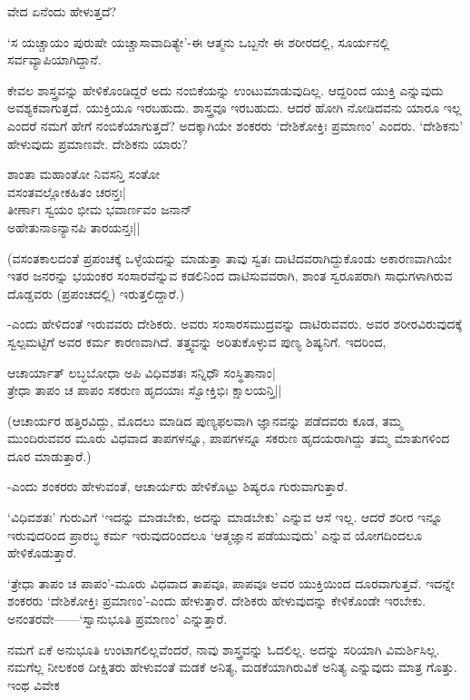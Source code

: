 ವೇದ ಏನೆಂದು ಹೇಳುತ್ತದೆ?

`ಸ ಯಚ್ಚಾಯಂ ಪುರುಷೇ ಯಚ್ಚಾಸಾವಾದಿತ್ಯೇ'-ಈ ಆತ್ಮನು ಒಬ್ಬನೇ ಈ ಶರೀರದಲ್ಲಿ, ಸೂರ್ಯನಲ್ಲಿ ಸರ್ವವ್ಯಾಪಿಯಾಗಿದ್ದಾನೆ.

ಕೇವಲ ಶಾಸ್ತ್ರವನ್ನು ಹೇಳಿಕೊಂಡಿದ್ದರೆ ಅದು ನಂಬಿಕೆಯನ್ನು ಉಂಟುಮಾಡುವುದಿಲ್ಲ. ಆದ್ದರಿಂದ ಯುಕ್ತಿ ಎನ್ನುವುದು ಅವಶ್ಯಕವಾಗುತ್ತದೆ. ಯುಕ್ತಿಯೂ ಇರಬಹುದು. ಶಾಸ್ತ್ರವೂ ಇರಬಹುದು. ಆದರೆ ಹೋಗಿ ನೋಡಿದವನು ಯಾರೂ ಇಲ್ಲ ಎಂದರೆ ನಮಗೆ ಹೇಗೆ ನಂಬಿಕೆಯಾಗುತ್ತದೆ? ಅದಕ್ಕಾಗಿಯೇ ಶಂಕರರು `ದೇಶಿಕೋಕ್ತಿಃ ಪ್ರಮಾಣಂ' ಎಂದರು. `ದೇಶಿಕನು' ಹೇಳುವುದು ಪ್ರಮಾಣವೇ. ದೇಶಿಕನು ಯಾರು?

\begin{shloka}
ಶಾಂತಾ ಮಹಾಂತೋ ನಿವಸನ್ತಿ ಸಂತೋ\\
ವಸಂತವಲ್ಲೋಕಹಿತಂ ಚರನ್ತಃ|\\
ತೀರ್ಣಾಃ ಸ್ವಯಂ ಭೀಮ ಭವಾರ್ಣವಂ ಜನಾನ್\\
ಅಹೇತುನಾಽನ್ಯಾನಪಿ ತಾರಯನ್ತಃ||
\end{shloka}

(ವಸಂತಕಾಲದಂತೆ ಪ್ರಪಂಚಕ್ಕೆ ಒಳ್ಳೆಯದನ್ನು ಮಾಡುತ್ತಾ ತಾವು ಸ್ವತಃ ದಾಟಿದವರಾಗಿದ್ದುಕೊಂಡು ಅಕಾರಣವಾಗಿಯೇ ಇತರ ಜನರನ್ನು ಭಯಂಕರ ಸಂಸಾರವೆನ್ನುವ ಕಡಲಿನಿಂದ ದಾಟಿಸುವವರಾಗಿ, ಶಾಂತ ಸ್ವರೂಪರಾಗಿ ಸಾಧುಗಳಾಗಿರುವ ದೊಡ್ಡವರು (ಪ್ರಪಂಚದಲ್ಲಿ) ಇರುತ್ತಲಿದ್ದಾರೆ.)

-ಎಂದು ಹೇಳಿದಂತೆ ಇರುವವರು ದೇಶಿಕರು. ಅವರು ಸಂಸಾರಸಮುದ್ರವನ್ನು ದಾಟಿರುವವರು. ಅವರ ಶರೀರವಿರುವುದಕ್ಕೆ ಸ್ವಲ್ಪಮಟ್ಟಿಗೆ ಅವರ ಕರ್ಮ ಕಾರಣವಾಗಿದೆ. ತತ್ತ್ವವನ್ನು ಅರಿತುಕೊಳ್ಳುವ ಪುಣ್ಯ ಶಿಷ್ಯನಿಗೆ. ಇದರಿಂದ,

\begin{shloka}
ಆಚಾರ್ಯಾತ್ ಲಬ್ಧಬೋಧಾ ಅಪಿ ವಿಧಿವಶತಃ ಸನ್ನಿಧೌ ಸಂಸ್ಥಿತಾನಾಂ|\\
ತ್ರೇಧಾ ತಾಪಂ ಚ ಪಾಪಂ ಸಕರುಣ ಹೃದಯಾಃ ಸ್ವೋಕ್ತಿಭಿಃ ಕ್ಷಾಲಯನ್ತಿ||
\end{shloka}

(ಆಚಾರ್ಯರ ಹತ್ತಿರವಿದ್ದು, ಮೊದಲು ಮಾಡಿದ ಪುಣ್ಯಫಲವಾಗಿ ಜ್ಞಾನವನ್ನು ಪಡೆದವರು ಕೂಡ, ತಮ್ಮ ಮುಂದಿರುವವರ ಮೂರು ವಿಧವಾದ ತಾಪಗಳನ್ನೂ, ಪಾಪಗಳನ್ನೂ ಸಕರುಣ ಹೃದಯರಾಗಿದ್ದು ತಮ್ಮ ಮಾತುಗಳಿಂದ ದೂರ ಮಾಡುತ್ತಾರೆ.)

-ಎಂದು ಶಂಕರರು ಹೇಳುವಂತೆ, ಆಚಾರ್ಯರು ಹೇಳಿಕೊಟ್ಟು ಶಿಷ್ಯರೂ ಗುರುವಾಗುತ್ತಾರೆ.

`ವಿಧಿವಶತಃ' ಗುರುವಿಗೆ `ಇದನ್ನು ಮಾಡಬೇಕು, ಅದನ್ನು ಮಾಡಬೇಕು' ಎನ್ನುವ ಆಸೆ ಇಲ್ಲ. ಆದರೆ ಶರೀರ ಇನ್ನೂ ಇರುವುದರಿಂದ ಪ್ರಾರಬ್ಧ ಕರ್ಮ ಇರುವುದರಿಂದಲೂ `ಆತ್ಮಜ್ಞಾನ ಪಡೆಯುವುದು' ಎನ್ನುವ ಯೋಗದಿಂದಲೂ ಹೇಳಿಕೊಡುತ್ತಾರೆ.

`ತ್ರೇಧಾ ತಾಪಂ ಚ ಪಾಪಂ'-ಮೂರು ವಿಧವಾದ ತಾಪವೂ, ಪಾಪವೂ ಅವರ ಯುಕ್ತಿಯಿಂದ ದೂರವಾಗುತ್ತವೆ. ಇದನ್ನೇ ಶಂಕರರು `ದೇಶಿಕೋಕ್ತಿಃ ಪ್ರಮಾಣಂ'-ಎಂದು ಹೇಳುತ್ತಾರೆ. ದೇಶಿಕರು ಹೇಳುವುದನ್ನು ಕೇಳಿಕೊಂಡೇ ಇರಬೇಕು. ಅನಂತರವೇ------`ಸ್ವಾನುಭೂತಿ ಪ್ರಮಾಣಂ' ಎನ್ನುತ್ತಾರೆ.

ನಮಗೆ ಏಕೆ ಅನುಭೂತಿ ಉಂಟಾಗಲಿಲ್ಲವೆಂದರೆ, ನಾವು ಶಾಸ್ತ್ರವನ್ನು ಓದಲಿಲ್ಲ. ಅದನ್ನು ಸರಿಯಾಗಿ ವಿಮರ್ಶಿಸಿಲ್ಲ. ನಮಗೆಲ್ಲ ನೀಲಕಂಠ ದೀಕ್ಷಿತರು ಹೇಳುವಂತೆ ಮಡಕೆ ಅನಿತ್ಯ, ಮಡಕೆಯಾಗಿರುವಿಕೆ ಅನಿತ್ಯ ಎನ್ನುವುದು ಮಾತ್ರ ಗೊತ್ತು. ಇಂಥ ವಿವೇಕ


   


